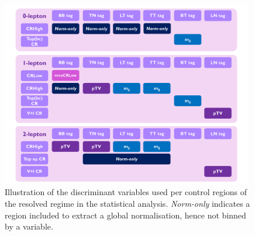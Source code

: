 \begin{figure}[h!]
  \center
  \includegraphics[width=0.98\textwidth]{Images/VH/Discriminants/Variables.pdf}
  \caption{Illustration of the discriminant variables used per control regions of the resolved regime in the statistical analysis. \textit{Norm-only} indicates a region included to extract a global normalisation, hence not binned by a variable.}
  \label{fig:variablesControlReg}
\end{figure}

